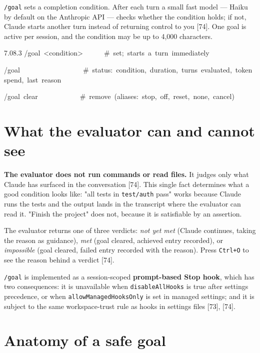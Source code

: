 \documentclass[11pt,a4paper,twoside,openany]{book}
\newcommand{\cl}[1]{\noindent\mbox{#1}\par}
\begin{document}
\texttt{/\allowbreak{}goal} sets a completion condition. After each turn a small fast model — Haiku by default on the Anthropic API — checks whether the condition holds; if not, Claude starts another turn instead of returning control to you [74]. One goal is active per session, and the condition may be up to 4,000 characters.


\begin{codeblock}{7.0}{8.3}
\cl{/goal~<condition>~~~~~~\#~set;~starts~a~turn~immediately}
\cl{/goal~~~~~~~~~~~~~~~~~~\#~status:~condition,~duration,~turns~evaluated,~token~spend,~last~reason}
\cl{/goal~clear~~~~~~~~~~~~\#~remove~(aliases:~stop,~off,~reset,~none,~cancel)}
\end{codeblock}

\FloatBarrier
\setcounter{section}{0}
\section{What the evaluator can and cannot see}

\textbf{The evaluator does not run commands or read files.} It judges only what Claude has surfaced in the conversation [74]. This single fact determines what a good condition looks like: "all tests in \texttt{test/\allowbreak{}auth} pass" works because Claude runs the tests and the output lands in the transcript where the evaluator can read it. "Finish the project" does not, because it is satisfiable by an assertion.


The evaluator returns one of three verdicts: \emph{not yet met} (Claude continues, taking the reason as guidance), \emph{met} (goal cleared, achieved entry recorded), or \emph{impossible} (goal cleared, failed entry recorded with the reason). Press \texttt{Ctrl+O} to see the reason behind a verdict [74].


\texttt{/\allowbreak{}goal} is implemented as a session-scoped \textbf{prompt-based Stop hook}, which has two consequences: it is unavailable when \texttt{disable\allowbreak{}All\allowbreak{}Hooks} is true after settings precedence, or when \texttt{allow\allowbreak{}Managed\allowbreak{}Hooks\allowbreak{}Only} is set in managed settings; and it is subject to the same workspace-trust rule as hooks in settings files [73], [74].


\FloatBarrier
\setcounter{section}{1}
\section{Anatomy of a safe goal}
\end{document}
